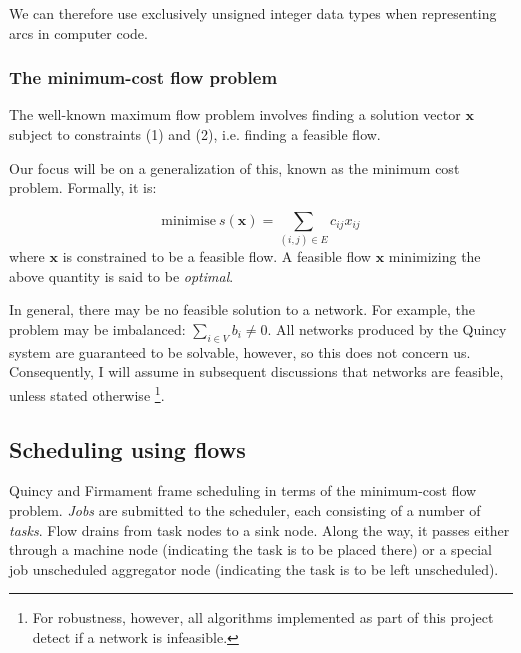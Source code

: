 We can therefore use exclusively unsigned integer data types when representing arcs in computer code.

\subsubsection{The minimum-cost flow problem} \label{sec:prep-flow-mcf}

The well-known maximum flow problem involves finding a solution vector
$\mathbf{x}$ subject to constraints (1) and (2), i.e. finding a feasible
flow.

Our focus will be on a generalization of this, known as the minimum
cost problem. Formally, it is:

\begin{equation} \label{eq:mcf-primal-problem}
\mbox{minimise}\ s(\mathbf{x})=\sum_{(i,j)\in E}c_{ij}x_{ij}
\end{equation}
where $\mathbf{x}$ is constrained to be a feasible flow. A feasible
flow $\mathbf{x}$ minimizing the above quantity is said to be \emph{optimal}.

In general, there may be no feasible solution to a network. For example,
the problem may be imbalanced: $\sum_{i\in V}b_{i}\neq0$. All networks
produced by the Quincy system are guaranteed to be solvable, however,
so this does not concern us. Consequently, I will assume in subsequent
discussions that networks are feasible, unless stated otherwise%
\footnote{For robustness, however, all algorithms implemented as part of this project detect if a network is infeasible.}.

\subsection{Scheduling using flows}


Quincy and Firmament frame scheduling in terms of the minimum-cost flow problem. \emph{Jobs} are submitted to the scheduler, each consisting of a number of \emph{tasks}. Flow drains from task nodes to a sink node. Along the way, it passes either through a machine node (indicating the task is to be placed there) or a special job unscheduled aggregator node (indicating the task is to be left unscheduled).

